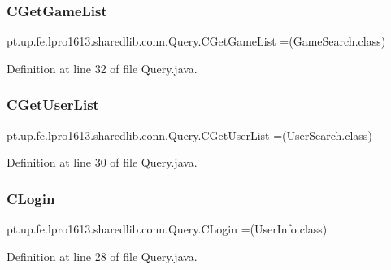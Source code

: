 \subsubsection{\texorpdfstring{C\+Get\+Game\+List}{CGetGameList}}
{\footnotesize\ttfamily pt.\+up.\+fe.\+lpro1613.\+sharedlib.\+conn.\+Query.\+C\+Get\+Game\+List =(Game\+Search.\+class)}



Definition at line 32 of file Query.\+java.

\hypertarget{enumpt_1_1up_1_1fe_1_1lpro1613_1_1sharedlib_1_1conn_1_1_query_ae3af9d0613ab8d210b7161a550f7bf14}{}\label{enumpt_1_1up_1_1fe_1_1lpro1613_1_1sharedlib_1_1conn_1_1_query_ae3af9d0613ab8d210b7161a550f7bf14} 
\subsubsection{\texorpdfstring{C\+Get\+User\+List}{CGetUserList}}
{\footnotesize\ttfamily pt.\+up.\+fe.\+lpro1613.\+sharedlib.\+conn.\+Query.\+C\+Get\+User\+List =(User\+Search.\+class)}



Definition at line 30 of file Query.\+java.

\hypertarget{enumpt_1_1up_1_1fe_1_1lpro1613_1_1sharedlib_1_1conn_1_1_query_a7b5129f1a1c06d802f15b47b5510e83c}{}\label{enumpt_1_1up_1_1fe_1_1lpro1613_1_1sharedlib_1_1conn_1_1_query_a7b5129f1a1c06d802f15b47b5510e83c} 
\subsubsection{\texorpdfstring{C\+Login}{CLogin}}
{\footnotesize\ttfamily pt.\+up.\+fe.\+lpro1613.\+sharedlib.\+conn.\+Query.\+C\+Login =(User\+Info.\+class)}



Definition at line 28 of file Query.\+java.

\hypertarget{enumpt_1_1up_1_1fe_1_1lpro1613_1_1sharedlib_1_1conn_1_1_query_aa40f948ae79a2adcea748969432f2ab3}{}\label{enumpt_1_1up_1_1fe_1_1lpro1613_1_1sharedlib_1_1conn_1_1_query_aa40f948ae79a2adcea748969432f2ab3} 
